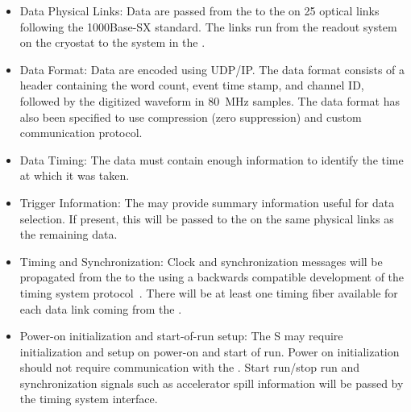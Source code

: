 


\begin{itemize}

\item Data Physical Links: Data are passed from the  to the  on 25 optical links following the 1000Base-SX standard. The links run from the  readout system on the cryostat to the  system in the .

\item Data Format: Data are encoded using UDP/IP.  The data format consists of a header containing the word count, event time stamp, and channel ID, followed by the digitized waveform in \SI{80}{MHz} samples.
The data format has also been specified to use compression (zero suppression) and custom communication protocol.

\item Data Timing: The data must contain enough information to identify the time at which it was taken.

\item Trigger Information: The  may provide summary information useful for data selection. If present, this will be passed to the  on the same physical links as the remaining data.

\item Timing and Synchronization: Clock and synchronization messages will be propagated from the  to the  using a backwards compatible development of the  timing system protocol~\cite{bib:docdb1651}. There will be at least one timing fiber available for each data link coming from the . 

\item Power-on initialization and start-of-run setup:  The S may require initialization and setup on power-on and start of run. Power on initialization should not require communication with the . Start run/stop run and synchronization signals such as accelerator spill information will be passed by the timing system interface.

\end{itemize}

